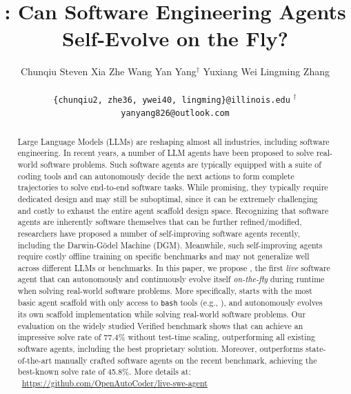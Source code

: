 \documentclass{article}
\title{\livesweagent: Can Software Engineering Agents Self-Evolve on the Fly?}
\author{Chunqiu Steven Xia\;
  Zhe Wang\;
  Yan Yang$^\dagger$\;
  Yuxiang Wei\;
  Lingming Zhang
  \\[\medskipamount]
  \uiuc{University of Illinois Urbana-Champaign}
  \\[\medskipamount]
  \small\texttt{\{chunqiu2, zhe36, ywei40, lingming\}@illinois.edu} $^\dagger$\small\texttt{yanyang826@outlook.com}
}
\begin{document}
\maketitle



\frenchspacing

\begin{abstract}
Large Language Models (LLMs) are reshaping almost all industries, including software engineering. In recent years, a number of LLM agents have been proposed to solve real-world software problems. Such software agents are typically equipped with a suite of coding tools and can autonomously decide the next actions to form complete trajectories to solve end-to-end software tasks. 
While promising, they typically require dedicated design and may still be suboptimal, since it can be extremely challenging and costly to exhaust the entire agent scaffold design space. 
Recognizing that software agents are inherently software themselves that can be further refined/modified, researchers have proposed a number of self-improving software agents recently, including the Darwin-Gödel Machine (DGM). Meanwhile, such self-improving agents require costly offline training on specific benchmarks and may not generalize well across different LLMs or benchmarks. 
In this paper, we propose \livesweagent, the first \emph{live} software agent that can autonomously and continuously evolve itself \emph{on-the-fly} during runtime when solving real-world software problems. More specifically, \livesweagent starts with the most basic agent scaffold with only access to \texttt{bash} tools (e.g., \minisweagent), and autonomously evolves its own scaffold implementation while solving real-world software problems. 
Our evaluation on the widely studied \swebench Verified benchmark shows that \livesweagent can achieve an impressive solve rate of 77.4\% without test-time scaling, outperforming all existing software agents, including the best proprietary solution. Moreover, \livesweagent outperforms state-of-the-art manually crafted software agents on the recent \swebenchpro benchmark, achieving the best-known solve rate of 45.8\%. More details at: \Github{}~\small{\color{purple}\url{https://github.com/OpenAutoCoder/live-swe-agent}}



\end{abstract}
\end{document}
